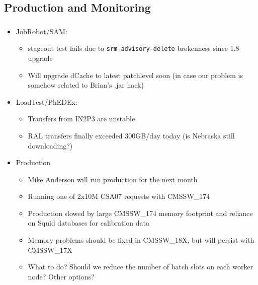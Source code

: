 \documentclass{beamer}
\begin{document}
\subsection{Production and Monitoring}
\begin{frame}
\frametitle{}
\begin{itemize}
    \item JobRobot/SAM:
    \begin{itemize}
        \item stageout test fails due to {\tt srm-advisory-delete} brokenness since 1.8 upgrade
        \item Will upgrade dCache to latest patchlevel soon (in case our problem is somehow related to Brian's .jar hack)
    \end{itemize}
    \item LoadTest/PhEDEx:
    \begin{itemize}
        \item Transfers from IN2P3 are unstable
        \item RAL transfers finally exceeded 300GB/day today (is Nebraska still downloading?)
    \end{itemize}
    \item Production
    \begin{itemize}
        \item Mike Anderson will run production for the next month
        \item Running one of 2x10M CSA07 requests with CMSSW\_174
        \item Production slowed by large CMSSW\_174 memory footprint and reliance on Squid databases for calibration data
        \item Memory problems should be fixed in CMSSW\_18X, but will persist with CMSSW\_17X
        \item What to do? Should we reduce the number of batch slots on each worker node? Other options?
    \end{itemize}
\end{itemize}
\end{frame}
\end{document}
